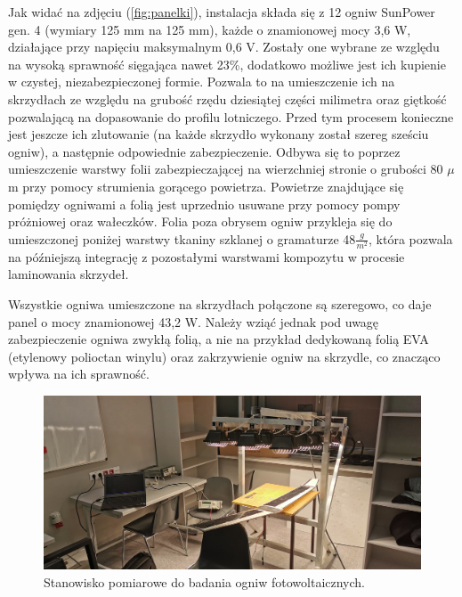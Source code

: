 \documentclass[12pt, a4paper]{article}
\let\oldref\ref
\renewcommand{\ref}[1]{(\oldref{#1})}
\begin{document}
Jak widać na zdjęciu \ref{fig:panelki}, instalacja składa się z 12 ogniw SunPower gen. 4 (wymiary 125 mm na 125 mm), każde o znamionowej mocy 3,6 W, działające przy napięciu maksymalnym 0,6 V. Zostały one wybrane ze względu na wysoką sprawność sięgająca nawet 23\%,  dodatkowo możliwe jest ich kupienie w czystej, niezabezpieczonej formie. Pozwala to na umieszczenie ich na skrzydłach ze względu na grubość rzędu dziesiątej części milimetra oraz giętkość pozwalającą na dopasowanie do profilu lotniczego. Przed tym procesem konieczne jest jeszcze ich zlutowanie (na każde skrzydło wykonany został szereg sześciu ogniw), a następnie odpowiednie zabezpieczenie. Odbywa się to poprzez umieszczenie warstwy folii  zabezpieczającej na wierzchniej stronie o grubości 80 $\mu$m przy pomocy strumienia gorącego powietrza. Powietrze znajdujące się pomiędzy ogniwami a folią jest uprzednio usuwane przy pomocy pompy próżniowej oraz wałeczków. Folia poza obrysem ogniw przykleja się do umieszczonej poniżej warstwy tkaniny szklanej o gramaturze 48$\frac{g}{m^2}$, która pozwala na późniejszą integrację z pozostałymi warstwami kompozytu w procesie laminowania skrzydeł.

Wszystkie ogniwa umieszczone na skrzydłach połączone są szeregowo, co daje panel o mocy znamionowej 43,2 W. Należy wziąć jednak pod uwagę zabezpieczenie ogniwa zwykłą folią, a nie na przykład dedykowaną folią EVA (etylenowy polioctan winylu) oraz zakrzywienie ogniw na skrzydle, co znacząco wpływa na ich sprawność.

\begin{figure}[ht]
    \centering
    \includegraphics[width=1\textwidth]{badania}
    \caption{Stanowisko pomiarowe do badania ogniw fotowoltaicznych.}
    \label{fig:badanie}
\end{figure}
\end{document}
